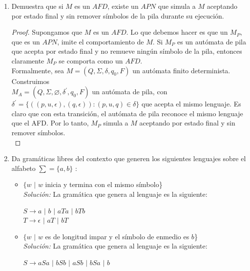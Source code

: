 \documentclass[letterpaper,11pt]{article}
\begin{document}
\begin{enumerate}
        \item Demuestra que si $M$ es un $AFD$, existe un $APN$ que simula 
        a $M$ aceptando por estado final y sin remover símbolos de la pila    
        durante su ejecución.
        \begin{proof}
            Supongamos que $M$ es un $AFD$. Lo que debemos hacer es que
            un $M_P$, que es un $APN$, imite el comportamiento de $M$. Si
            $M_P$ es un autómata de pila que acepta por estado final y no
            remueve ningún símbolo de la pila, entonces claramente $M_P$
            se comporta como un $AFD$. \\
            Formalmente, sea $M = (Q, \Sigma, \delta, q_0, F)$ un autómata finito
            determinista. Construimos \\
            $M_A = (Q, \Sigma, \varnothing,\delta^{'}, q_0, F)$ un autómata de pila,
            con $\delta^{'} = \{((p,u,\epsilon), (q, \epsilon)) :  (p, u, q) \in \delta\}$
            que acepta el mismo lenguaje. Es claro que con esta transición, el
            autómata de pila reconoce el mismo lenguaje que el AFD. Por lo tanto,
            $M_P$ simula a $M$ aceptando por estado final y sin remover símbolos.\\             
            
        \end{proof}
        
        \newpage
        \item Da gramáticas libres del contexto que generen los siguientes
        lenguajes sobre el alfabeto $\sum = \{a,b\}$ :
        \begin{itemize}
            \item $\{w$ $|$ $w$ inicia y termina con el mismo símbolo\} \\
            \textit{Solución:} La gramática que genera al lenguaje es la
            siguiente:
            \begin{center}
                $S \rightarrow a$ $|$ $b$ $|$ $aTa$ $|$ $bTb$ \\
                $T \rightarrow \epsilon$ $|$ $aT$ $|$ $bT$
            \end{center}
            
            \item $\{w$ $|$ $w$ es de longitud impar y el símbolo de enmedio 
            es $b$\} \\
            \textit{Solución:} La gramática que genera al lenguaje es la
            siguiente:
            \begin{center}
                $S \rightarrow aSa$ $|$ $bSb$ $|$ $aSb$ $|$ $bSa$ $|$ $b$
            \end{center}
           

\end{itemize}
\end{enumerate}
\end{document}
